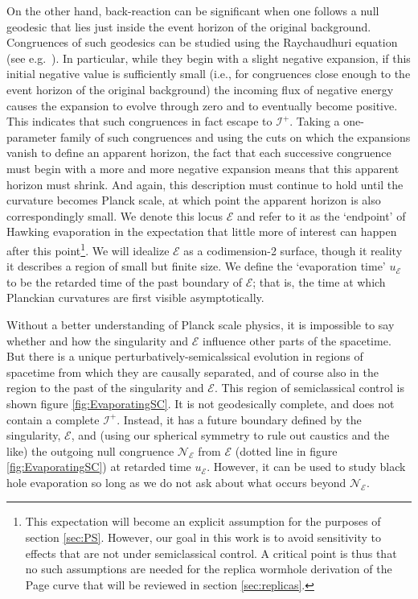 \documentclass[letterpaper,12pt]{article}
\newcommand*{\scri}{\mathscr{I}} %
\newcommand*{\evap}{\mathscr{E}} %
\begin{document}
On the other hand, back-reaction can be significant when one follows a null geodesic that lies just inside the event horizon of the original background.  Congruences of such geodesics can be studied using the Raychaudhuri equation (see e.g.\ \cite{Wald:1984rg}).  In particular, while they begin with a slight negative expansion, if this initial negative value is sufficiently small (i.e., for congruences close enough to the event horizon of the original background) the incoming flux of negative energy causes the expansion to evolve through zero and to eventually become positive.  This indicates that such congruences in fact escape to $\scri^+$.  Taking a one-parameter family of such congruences and using the cuts on which the expansions vanish to define an apparent horizon, the fact that each successive congruence must begin with a more and more negative expansion means that this apparent horizon must shrink.  And again, this description must continue to hold until the curvature becomes Planck scale, at which point the apparent horizon is also correspondingly small.  We denote this locus $\evap$ and refer to it as the `endpoint' of Hawking evaporation in the expectation that little more of interest can happen after this point\footnote{This expectation will become an explicit assumption for the purposes of section \ref{sec:PS}.  However, our goal in this work is to avoid sensitivity to effects that are not under semiclassical control.  A critical point is thus that no such assumptions are needed for the replica wormhole derivation of the Page curve that will be reviewed in section \ref{sec:replicas}.}.  We will idealize $\evap$ as a codimension-2 surface, though it reality it describes a region of small but finite size. We define the `evaporation time' $u_\evap$ to be the retarded time of the past boundary of $\evap$; that is, the time at which Planckian curvatures are first visible asymptotically.

Without a better understanding of Planck scale physics, it is impossible to say whether and how the singularity and $\evap$ influence other parts of the spacetime.  But there is a unique perturbatively-semicalssical evolution in regions of spacetime from which they are causally separated, and of course also in the region to the past of the singularity and $\evap$.  This region of semiclassical control is shown  figure \ref{fig:EvaporatingSC}.  It is not geodesically complete, and does not contain a complete $\scri^+$.  Instead, it has a future boundary defined by
the singularity, $\evap$, and (using our spherical symmetry to rule out caustics and the like) the outgoing null congruence $\mathcal{N}_\evap$ from $\evap$ (dotted line in figure \ref{fig:EvaporatingSC}) at retarded time $u_\evap$.
However, it can be used to study black hole evaporation so long as we do not ask about what occurs beyond $\mathcal{N}_\evap$.
\end{document}
